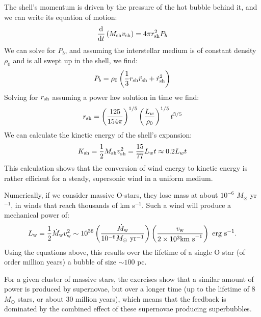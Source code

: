 The shell's momentum is driven by the pressure of the hot bubble
behind it, and we can write its equation of motion:
\begin{equation}
\label{eq:shell}
\frac{{\rm d}}{{\rm d}t} \left(M_{\rm sh} v_{\rm sh}\right) = 4\pi
r_{\rm sh}^2 P_b
\end{equation}
We can solve for $P_b$, and assuming the interstellar medium is of
constant density $\rho_0$ and is all swept up in the shell, we find:
\begin{equation}
\label{eq:shell-pb}
P_b = \rho_0\left(\frac{1}{3} r_{\rm sh} {\ddot r}_{\rm sh} + {\dot
r}_{\rm sh}^2\right)
\end{equation}
Solving for $r_{\rm sh}$ assuming a power law solution in time we
find:
\begin{equation}
\label{eq:shell-evolution}
r_{\rm sh}
= \left(\frac{125}{154\pi}\right)^{1/5} \left(\frac{L_w}{\rho_0}\right)^{1/5}
t^{3/5}
\end{equation}
We can calculate the kinetic energy of the shell's expansion:
\begin{equation}
\label{eq:shell-kinetic}
K_{\rm sh} = \frac{1}{2} M_{\rm sh} v_{\rm sh}^2 = \frac{15}{77}L_w
t \approx 0.2 L_w t
\end{equation}
This calculation shows that the conversion of wind energy to kinetic
energy is rather efficient for a steady, supersonic wind in a uniform
medium.

Numerically, if we consider massive O-stars, they lose mass at about
$10^{-6}$ $M_\odot$ yr$^{-1}$, in winds that reach thousands of km
s$^{-1}$. Such a wind will produce a mechanical power of:
\begin{equation}
L_{\rm w} = \frac{1}{2} \dot M_{\rm w} v_{\rm w}^2 \sim 10^{36}
\left(\frac{\dot M_{\rm w}}{10^{-6} M_\odot {\rm ~yr}^{-1}}\right)
\left(\frac{v_{\rm w}} {2\times 10^3 {\rm km~s}^{-1}} \right) {\rm ~erg~s}^{-1}.
\end{equation}
Using the equations above, this results over the lifetime of a single
O star (of order million years) a bubble of size $\sim 100$ pc.

For a given cluster of massive stars, the exercises show that a
similar amount of power is produced by supernovae, but over a longer
time (up to the lifetime of 8 $M_\odot$ stars, or about 30 million
years), which means that the feedback is dominated by the combined
effect of these supernovae producing superbubbles.

